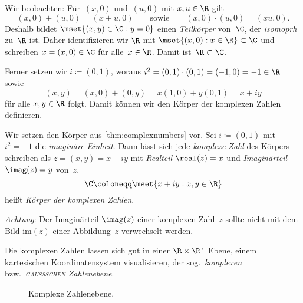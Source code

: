 \documentclass[a4paper]{article}
\begin{document}
Wir beobachten: Für~$(x, 0)$ und~$(u, 0)$ mit $x,u \in \R$ gilt
\begin{equation*}
    (x, 0) + (u, 0) = (x+u, 0) \qquad\text{sowie}\qquad (x, 0) \cdot (u, 0) = (xu, 0).
\end{equation*}
Deshalb bildet $\mset{(x,y) \in \C : y = 0}$ einen \emph{Teilkörper} von~$\C$, der \emph{isomoprh} zu~$\R$ ist. Daher identifizieren wir $\R$ mit $\mset{(x, 0) : x \in \R} \subset \C$ und schreiben $x = (x, 0) \in \C$ für alle~$x \in \R$. Damit ist~$\R \subset \C$.

Ferner setzen wir $i \coloneqq (0, 1)$, woraus $i^2 = (0, 1)\cdot(0, 1) = (-1, 0) = -1 \in \R$ sowie
\begin{equation*}
    (x,y) = (x, 0)+(0,y) = x(1, 0)+y(0, 1) = x+iy
\end{equation*}
für alle $x,y \in \R$ folgt. Damit können wir den Körper der komplexen Zahlen definieren.

\begin{definition}
    Wir setzen den Körper aus \cref{thm:complexnumbers} vor. Sei $i \coloneqq (0, 1)$ mit~$i^2 = -1$ die \emph{imaginäre Einheit}. Dann lässt sich jede \emph{komplexe Zahl} des Körpers schreiben als $z = (x,y) = x+iy$ mit \emph{Realteil} $\real(z) = x$ und \emph{Imaginärteil} $\imag(z) = y$ von~$z$.
    \begin{equation*}
        \C \coloneqq \mset{x+iy : x,y \in \R}
    \end{equation*}
    heißt \emph{Körper der komplexen Zahlen}.
\end{definition}

\emph{Achtung}: Der Imaginärteil $\imag(z)$ einer komplexen Zahl~$z$ sollte nicht mit dem Bild $\mathrm{im}(z)$ einer Abbildung~$z$ verwechselt werden.

Die komplexen Zahlen lassen sich gut in einer $\R\times\R$"~Ebene, einem kartesischen Koordinatensystem visualisieren, der sog.\ \emph{komplexen} bzw.\ \emph{\textsc{gaußschen} Zahlenebene}.

\begin{figure}
    \caption{Komplexe Zahlenebene.}
\end{figure}
\end{document}
